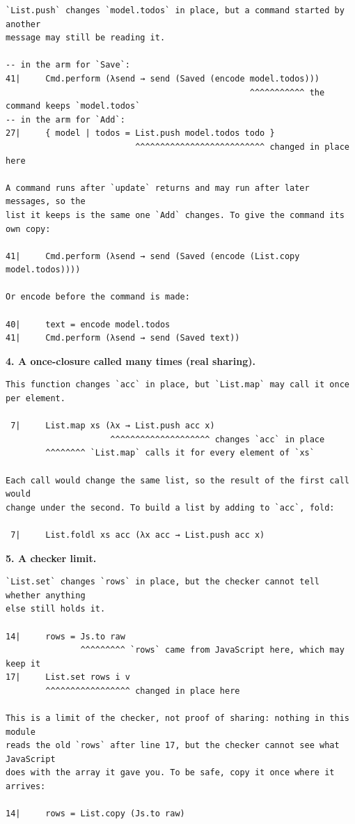 \begin{Verbatim}
`List.push` changes `model.todos` in place, but a command started by another
message may still be reading it.

-- in the arm for `Save`:
41|     Cmd.perform (λsend → send (Saved (encode model.todos)))
                                                 ^^^^^^^^^^^ the command keeps `model.todos`
-- in the arm for `Add`:
27|     { model | todos = List.push model.todos todo }
                          ^^^^^^^^^^^^^^^^^^^^^^^^^^ changed in place here

A command runs after `update` returns and may run after later messages, so the
list it keeps is the same one `Add` changes. To give the command its own copy:

41|     Cmd.perform (λsend → send (Saved (encode (List.copy model.todos))))

Or encode before the command is made:

40|     text = encode model.todos
41|     Cmd.perform (λsend → send (Saved text))
\end{Verbatim}

\textbf{4. A once-closure called many times (real sharing).}

\begin{Verbatim}
This function changes `acc` in place, but `List.map` may call it once per element.

 7|     List.map xs (λx → List.push acc x)
                     ^^^^^^^^^^^^^^^^^^^^ changes `acc` in place
        ^^^^^^^^ `List.map` calls it for every element of `xs`

Each call would change the same list, so the result of the first call would
change under the second. To build a list by adding to `acc`, fold:

 7|     List.foldl xs acc (λx acc → List.push acc x)
\end{Verbatim}

\textbf{5. A checker limit.}

\begin{Verbatim}
`List.set` changes `rows` in place, but the checker cannot tell whether anything
else still holds it.

14|     rows = Js.to raw
               ^^^^^^^^^ `rows` came from JavaScript here, which may keep it
17|     List.set rows i v
        ^^^^^^^^^^^^^^^^^ changed in place here

This is a limit of the checker, not proof of sharing: nothing in this module
reads the old `rows` after line 17, but the checker cannot see what JavaScript
does with the array it gave you. To be safe, copy it once where it arrives:

14|     rows = List.copy (Js.to raw)
\end{Verbatim}

